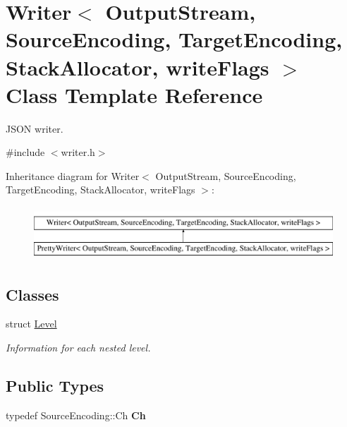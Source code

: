 \hypertarget{classWriter}{}\section{Writer$<$ Output\+Stream, Source\+Encoding, Target\+Encoding, Stack\+Allocator, write\+Flags $>$ Class Template Reference}
\label{classWriter}


J\+S\+ON writer.  




{\ttfamily \#include $<$writer.\+h$>$}

Inheritance diagram for Writer$<$ Output\+Stream, Source\+Encoding, Target\+Encoding, Stack\+Allocator, write\+Flags $>$\+:\begin{figure}[H]
\begin{center}
\leavevmode
\includegraphics[height=2.000000cm]{classWriter}
\end{center}
\end{figure}
\subsection*{Classes}
\begin{DoxyCompactItemize}
\item 
struct \hyperlink{structWriter_1_1Level}{Level}
\begin{DoxyCompactList}\small\item\em Information for each nested level. \end{DoxyCompactList}\end{DoxyCompactItemize}
\subsection*{Public Types}
\begin{DoxyCompactItemize}
\item 
typedef Source\+Encoding\+::\+Ch {\bfseries Ch}\hypertarget{classWriter_ab08bff5fd2daec65f4a78779ca3d2139}{}\label{classWriter_ab08bff5fd2daec65f4a78779ca3d2139}

\end{DoxyCompactItemize}
